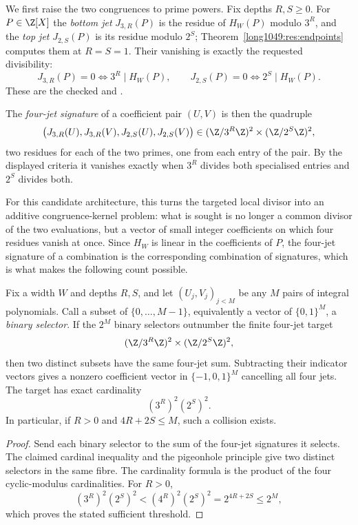\documentclass[11pt]{article}
\begin{document}
We first raise the two congruences to prime powers.  Fix depths \(R,S\ge0\).
For \(P\in\Z[X]\) the \emph{bottom jet} \(J_{3,R}(P)\) is the residue of
\(H_W(P)\) modulo \(3^R\), and the \emph{top jet} \(J_{2,S}(P)\) is its residue
modulo \(2^S\); Theorem~\ref{long1049:res:endpoints} computes them at \(R=S=1\).  Their
vanishing is exactly the requested divisibility:
\[
 J_{3,R}(P)=0\iff 3^R\mid H_W(P),\qquad
 J_{2,S}(P)=0\iff 2^S\mid H_W(P).
\]
These are the checked
 and
.

The \emph{four-jet signature} of a coefficient pair
\((U,V)\) is then the quadruple
\[
 \bigl(J_{3,R}(U),J_{3,R}(V),J_{2,S}(U),J_{2,S}(V)\bigr)
 \in(\Z/3^R\Z)^2\times(\Z/2^S\Z)^2 ,
\]
two residues for each of the two primes, one from each entry of the pair.  By
the displayed criteria it vanishes exactly when \(3^R\) divides both specialised
entries and \(2^S\) divides both.

For this candidate architecture, this turns the targeted local divisor into an additive
congruence-kernel problem: what is sought is no longer a common divisor of
the two evaluations, but a vector of small integer coefficients on which four
residues vanish at once.  Since \(H_W\) is linear in the coefficients of \(P\),
the four-jet signature of a combination is the corresponding combination of
signatures, which is what makes the following count possible.

\begin{theorem}\label{long1049:res:jetkernel}
Fix a width \(W\) and depths \(R,S\), and let \((U_j,V_j)_{j<M}\) be any \(M\)
pairs of integral polynomials.  Call a subset of \(\{0,\dots,M-1\}\), equivalently
a vector of \(\{0,1\}^M\), a \emph{binary selector}.  If the
\(2^M\) binary selectors outnumber the finite four-jet target
\[
 (\Z/3^R\Z)^2\times(\Z/2^S\Z)^2,
\]
then two distinct subsets have the same four-jet sum.  Subtracting their
indicator vectors gives a nonzero coefficient vector in
\(\{-1,0,1\}^M\) cancelling all four jets.  The target has exact cardinality
\[
 (3^R)^2(2^S)^2.
\]
In particular, if \(R>0\) and \(4R+2S\le M\), such a collision exists.
\end{theorem}

\begin{proof}
Send each binary selector to the sum of the four-jet signatures it selects.
The claimed cardinal inequality and the pigeonhole principle give two
distinct selectors in the same fibre.  The cardinality formula is the product
of the four cyclic-modulus cardinalities.  For \(R>0\),
\[
 (3^R)^2(2^S)^2<(4^R)^2(2^S)^2=2^{4R+2S}\le2^M,
\]
which proves the stated sufficient threshold.
\end{proof}
\end{document}
